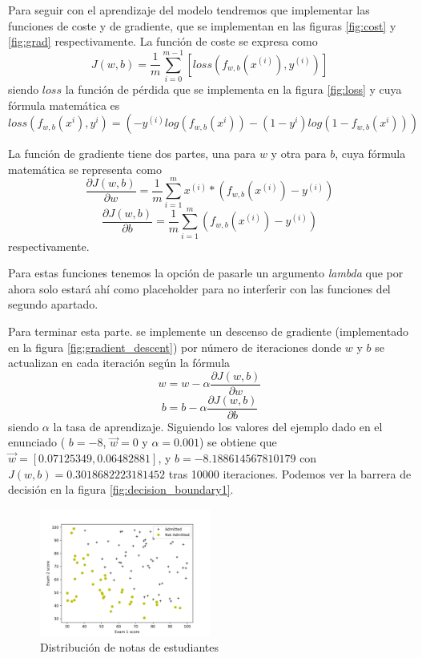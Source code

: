 \documentclass[6pt]{AiTex}
\begin{document}
Para seguir con el aprendizaje del modelo tendremos que implementar las funciones de coste y de gradiente, que se implementan en las figuras \ref{fig:cost} y \ref{fig:grad} respectivamente. La función de coste se expresa como \[J(w,b) = \frac{1}{m} \sum_{i=0}^{m -1} [loss(f_{w,b}(x^{(i)}),y^{(i)})]\] siendo $loss$ la función de pérdida que se implementa en la figura \ref{fig:loss} y cuya fórmula matemática es \[loss(f_{w,b}(x^{i}), y^{i}) = (-y^{(i)}log(f_{w,b}(x^{i})) - (1-y^{i})log(1-f_{w,b}(x^{i})))\]

La función de gradiente tiene dos partes, una para $w$ y otra para $b$, cuya fórmula matemática se representa como \[\frac{\partial J(w,b)}{\partial w} = \frac{1}{m} \sum_{i=1}^{m} x^{(i)} * (f_{w,b}(x^{(i)}) - y^{(i)})\] \[\frac{\partial J(w,b)}{\partial b} = \frac{1}{m} \sum_{i=1}^{m} (f_{w,b}(x^{(i)}) - y^{(i)})\] respectivamente.

Para estas funciones tenemos la opción de pasarle un argumento \textit{lambda} que por ahora solo estará ahí como placeholder para no interferir con las funciones del segundo apartado.

Para terminar esta parte. se implemente un descenso de gradiente (implementado en la figura \ref{fig:gradient_descent}) por número de iteraciones donde $w$ y $b$ se actualizan en cada iteración según la fórmula \[w = w - \alpha \frac{\partial J(w,b)}{\partial w}\] \[b = b - \alpha \frac{\partial J(w,b)}{\partial b}\] siendo $\alpha$ la tasa de aprendizaje. Siguiendo los valores del ejemplo dado en el enunciado ( $b = -8$, $\vec{w} = 0$ y $\alpha = 0.001$) se obtiene que $\vec{w} = [0.07125349, 0.06482881]$, y $b = -8.188614567810179$ con $J(w,b) = 0.3018682223181452$ tras 10000 iteraciones. Podemos ver la barrera de decisión en la figura \ref{fig:decision_boundary1}.

\begin{figure}[H]
    \centering
    \includegraphics[width=0.5\textwidth]{./imagenes/muestreo1.png}
    \caption{Distribución de notas de estudiantes}
    \label{fig:dataset1}
\end{figure}
\end{document}
